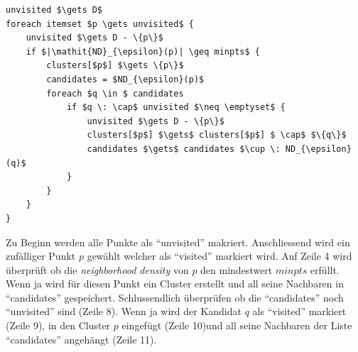 
\begin{lstlisting}
unvisited $\gets D$
foreach itemset $p \gets unvisited$ {
	unvisited $\gets D - \{p\}$
	if $|\mathit{ND}_{\epsilon}(p)| \geq minpts$ {
		clusters[$p$] $\gets \{p\}$
		candidates = $ND_{\epsilon}(p)$
		foreach $q \in $ candidates
			if $q \: \cap$ unvisited $\neq \emptyset$ {
				unvisited $\gets D - \{p\}$
				clusters[$p$] $\gets$ clusters[$p$] $ \cap$ $\{q\}$
				candidates $\gets$ candidates $\cup \: ND_{\epsilon}(q)$
			}
		}
	}
}
\end{lstlisting}
Zu Beginn werden alle Punkte als "`unvisited"' makriert. Anschliessend wird ein zufälliger Punkt $p$ gewählt welcher als "`visited"' markiert wird. Auf Zeile 4 wird überprüft ob die \textit{neighborhood density} von $p$ den mindestwert $minpts$ erfüllt. Wenn ja wird für diesen Punkt ein Cluster erstellt und all seine Nachbaren in "`candidates"' gespeichert. Schlussendlich überprüfen ob die "`candidates"' noch "`unvisited"' sind (Zeile 8). Wenn ja wird der Kandidat $q$ als "`visited"' markiert (Zeile 9), in den Cluster $p$ eingefügt (Zeile 10)und all seine Nachbaren der Liste "`candidates"' angehängt (Zeile 11).

